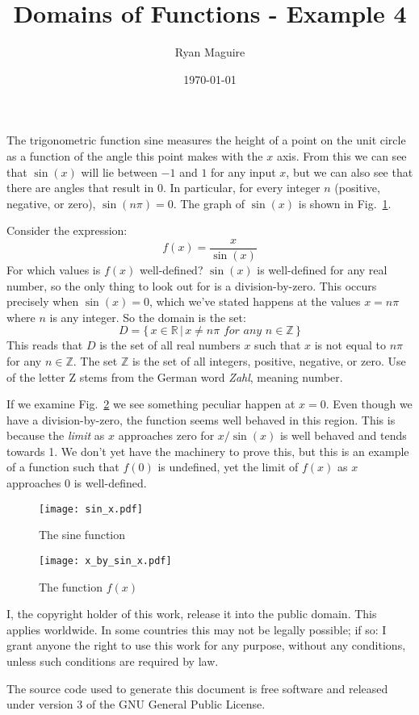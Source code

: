 \documentclass{article}
\title{Domains of Functions - Example 4}
\author{Ryan Maguire}
\date{\today}
\begin{document}
    \maketitle
    The trigonometric function sine measures the height of a point on the
    unit circle as a function of the angle this point makes with the $x$ axis.
    From this we can see that $\sin(x)$ will lie between $-1$ and $1$ for any
    input $x$, but we can also see that there are angles that result in
    $0$. In particular, for every integer $n$ (positive, negative, or zero),
    $\sin(n\pi)=0$. The graph of $\sin(x)$ is shown in
    Fig.~\ref{fig:sin_x}.
    \par\hfill\par
    Consider the expression:
    \begin{equation}
        f(x)=\frac{x}{\sin(x)}
    \end{equation}
    For which values is $f(x)$ well-defined? $\sin(x)$ is well-defined for any
    real number, so the only thing to look out for is a division-by-zero.
    This occurs precisely when $\sin(x)=0$, which we've stated happens at the
    values $x=n\pi$ where $n$ is any integer. So the domain is the set:
    \begin{equation}
        D=\{\,x\in\mathbb{R}\,|\,x\ne{n\pi}\textit{ for any }n\in\mathbb{Z}\,\}
    \end{equation}
    This reads that $D$ is the set of all real numbers $x$ such that $x$ is
    not equal to $n\pi$ for any $n\in\mathbb{Z}$. The set $\mathbb{Z}$ is the
    set of all integers, positive, negative, or zero. Use of the letter Z stems
    from the German word \textit{Zahl}, meaning number.
    \par\hfill\par
    If we examine Fig.~\ref{fig:x_by_sin_x} we see something peculiar happen
    at $x=0$. Even though we have a division-by-zero, the function seems well
    behaved in this region. This is because the \textit{limit} as $x$
    approaches zero for $x/\sin(x)$ is well behaved and tends towards 1. We
    don't yet have the machinery to prove this, but this is an example of a
    function such that $f(0)$ is undefined, yet the limit of $f(x)$ as $x$
    approaches 0 is well-defined.
    \begin{figure}
        \centering
        \texttt{[image: sin\_x.pdf]}
        \caption{The sine function}
        \label{fig:sin_x}
    \end{figure}
    \begin{figure}
        \centering
        \texttt{[image: x\_by\_sin\_x.pdf]}
        \caption{The function $f(x)$}
        \label{fig:x_by_sin_x}
    \end{figure}
    \newpage
    I, the copyright holder of this work, release it into the public domain.
    This applies worldwide. In some countries this may not be legally possible;
    if so: I grant anyone the right to use this work for any purpose, without
    any conditions, unless such conditions are required by law.
    \par\hfill\par
    The source code used to generate this document is free software and released
    under version 3 of the GNU General Public License.
\end{document}
